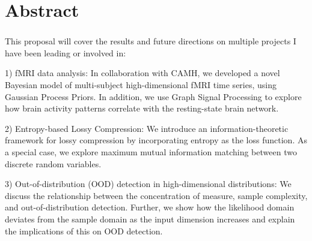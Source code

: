 \chapter*{Abstract} 
\subsection*{\thesistitle}

This proposal will cover the results and future directions on multiple projects I have been leading or involved in: 

1) fMRI data analysis: In collaboration with CAMH, we developed a novel Bayesian model of multi-subject high-dimensional fMRI time series, using Gaussian Process Priors. In addition, we use Graph Signal Processing to explore how brain activity patterns correlate with the resting-state brain network. 


2) Entropy-based Lossy Compression: We introduce an information-theoretic framework for lossy compression by incorporating entropy as the loss function. As a special case, we explore maximum mutual information matching between two discrete random variables. 

3) Out-of-distribution (OOD) detection in high-dimensional distributions: We discuss the relationship between the concentration of measure, sample complexity, and out-of-distribution detection. Further, we show how the likelihood domain deviates from the sample domain as the input dimension increases and explain the implications of this on OOD detection. 

